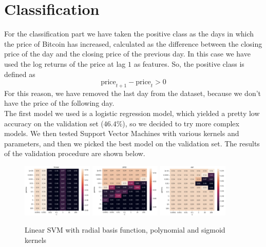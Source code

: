 \documentclass[12pt]{article}
\begin{document}
\section{Classification}
For the classification part we have taken the positive class as the days in which the price of Bitcoin has increased, calculated as the difference between the closing price of the day and the closing price of the previous day.
In this case we have used the log returns of the price at lag $1$ as features.
So, the positive class is defined as
\begin{equation}
    \text{price}_{t+1} - \text{price}_t > 0
\end{equation}
For this reason, we have removed the last day from the dataset, because we don't have the price of the following day.
\vspace{0.5cm}
\\The first model we used is a logistic regression model, which yielded a pretty low accuracy on the validation set ($46.4\%$),
so we decided to try more complex models.
We then tested Support Vector Machines with various kernels and parameters,
and then we picked the best model on the validation set.
The results of the validation procedure are shown below.

\begin{figure}[h]
    \centering
    \includegraphics[width=0.3\textwidth]{linear_svm_class}
    \includegraphics[width=0.3\textwidth]{poly_svm_class}
    \includegraphics[width=0.3\textwidth]{rbf_svm_class}
    \caption{Linear SVM with radial basis function, polynomial and sigmoid kernels}
    \label{fig:linear_svm}
\end{figure}
\end{document}
